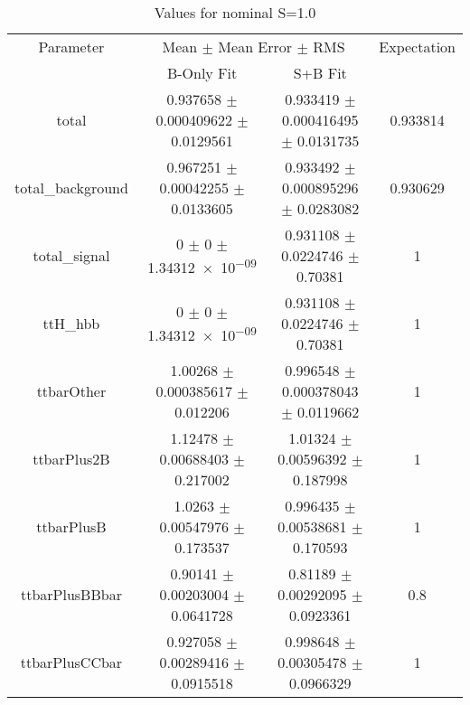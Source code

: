 \begin{table}
\centering
\caption{Values for nominal S=1.0}
\begin{tabular}{cccc}
\toprule
Parameter & \multicolumn{2}{c}{Mean $\pm$ Mean Error $\pm$ RMS} & Expectation\\
 & B-Only Fit & S+B Fit & \\
\midrule
total & \num{0.937658} $\pm$ \num{0.000409622} $\pm$ \num{0.0129561} & \num{0.933419} $\pm$ \num{0.000416495} $\pm$ \num{0.0131735} & \num{0.933814}\\
total\_background & \num{0.967251} $\pm$ \num{0.00042255} $\pm$ \num{0.0133605} & \num{0.933492} $\pm$ \num{0.000895296} $\pm$ \num{0.0283082} & \num{0.930629}\\
total\_signal & \num{0} $\pm$ \num{0} $\pm$ \num{1.34312e-09} & \num{0.931108} $\pm$ \num{0.0224746} $\pm$ \num{0.70381} & \num{1}\\
ttH\_hbb & \num{0} $\pm$ \num{0} $\pm$ \num{1.34312e-09} & \num{0.931108} $\pm$ \num{0.0224746} $\pm$ \num{0.70381} & \num{1}\\
ttbarOther & \num{1.00268} $\pm$ \num{0.000385617} $\pm$ \num{0.012206} & \num{0.996548} $\pm$ \num{0.000378043} $\pm$ \num{0.0119662} & \num{1}\\
ttbarPlus2B & \num{1.12478} $\pm$ \num{0.00688403} $\pm$ \num{0.217002} & \num{1.01324} $\pm$ \num{0.00596392} $\pm$ \num{0.187998} & \num{1}\\
ttbarPlusB & \num{1.0263} $\pm$ \num{0.00547976} $\pm$ \num{0.173537} & \num{0.996435} $\pm$ \num{0.00538681} $\pm$ \num{0.170593} & \num{1}\\
ttbarPlusBBbar & \num{0.90141} $\pm$ \num{0.00203004} $\pm$ \num{0.0641728} & \num{0.81189} $\pm$ \num{0.00292095} $\pm$ \num{0.0923361} & \num{0.8}\\
ttbarPlusCCbar & \num{0.927058} $\pm$ \num{0.00289416} $\pm$ \num{0.0915518} & \num{0.998648} $\pm$ \num{0.00305478} $\pm$ \num{0.0966329} & \num{1}\\
\bottomrule
\end{tabular}
\end{table}